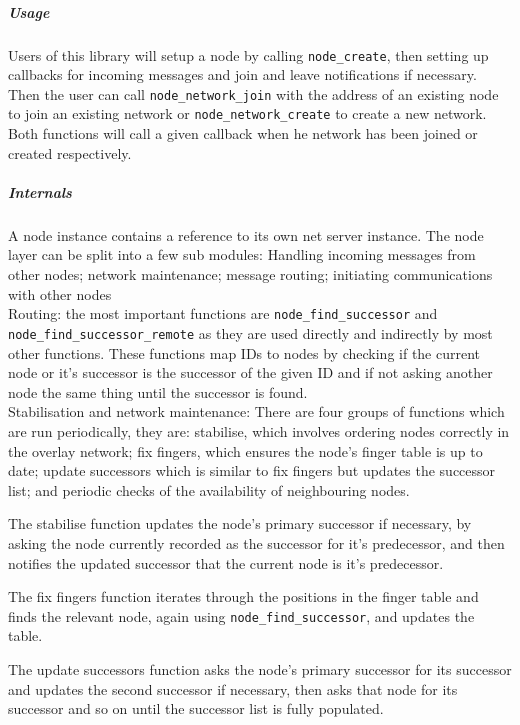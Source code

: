 \documentclass{article}
\begin{document}

\subparagraph{Usage}
Users of this library will setup a node by calling \texttt{node\_create}, then setting up callbacks for incoming messages and join and leave notifications if necessary.
\\
Then the user can call \texttt{node\_network\_join} with the address of an existing node to join an existing network or \texttt{node\_network\_create} to create a new network. Both functions will call a given callback when he network has been joined or created respectively.

\subparagraph{Internals}
A node instance contains a reference to its own net server instance.
The node layer can be split into a few sub modules: Handling incoming messages from other nodes; network maintenance; message routing; initiating communications with other nodes
\\

\noindent
Routing: the most important functions are \texttt{node\_find\_successor} and \\\texttt{node\_find\_successor\_remote} as they are used directly and indirectly by most other functions. These functions map IDs to nodes by checking if the current node or it's successor is the successor of the given ID and if not asking another node the same thing until the successor is found.
\\

\noindent
Stabilisation and network maintenance: There are four groups of functions which are run periodically, they are: stabilise, which involves ordering nodes correctly in the overlay network; fix fingers, which ensures the node's finger table is up to date; update successors which is similar to fix fingers but updates the successor list; and periodic checks of the availability of neighbouring nodes.

The stabilise function updates the node's primary successor if necessary, by asking the node currently recorded as the successor for it's predecessor, and then notifies the updated successor that the current node is it's predecessor.

The fix fingers function iterates through the positions in the finger table and finds the relevant node, again using \texttt{node\_find\_successor}, and updates the table.

The update successors function asks the node's primary successor for its successor and updates the second successor if necessary, then asks that node for its successor and so on until the successor list is fully populated.
\end{document}
